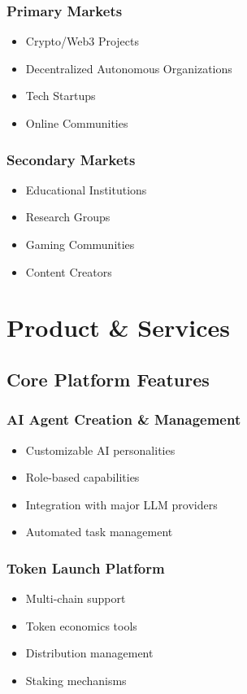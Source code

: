 \documentclass[11pt]{article}
\begin{document}
\subsubsection{Primary Markets}
\begin{itemize}
    \item Crypto/Web3 Projects
    \item Decentralized Autonomous Organizations
    \item Tech Startups
    \item Online Communities
\end{itemize}

\subsubsection{Secondary Markets}
\begin{itemize}
    \item Educational Institutions
    \item Research Groups
    \item Gaming Communities
    \item Content Creators
\end{itemize}

\section{Product \& Services}

\subsection{Core Platform Features}

\subsubsection{AI Agent Creation \& Management}
\begin{itemize}
    \item Customizable AI personalities
    \item Role-based capabilities
    \item Integration with major LLM providers
    \item Automated task management
\end{itemize}

\subsubsection{Token Launch Platform}
\begin{itemize}
    \item Multi-chain support
    \item Token economics tools
    \item Distribution management
    \item Staking mechanisms
\end{itemize}
\end{document}
